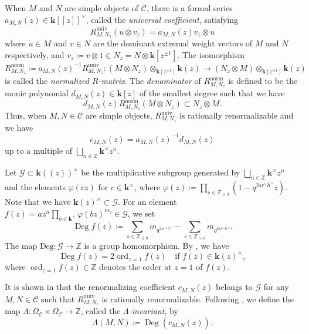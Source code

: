 \documentclass[12pt]{amsart}
\theoremstyle{definition}
\theoremstyle{remark}
\numberwithin{equation}{section}
\begin{document}
When $M$ and $N$ are simple objects of $\mathscr{C}$, there is a formal series $a_{M,N}(z) \in \mathbf{k}[\![z]\!]^\times$, called the {\em universal coefficient}, satisfying
\[ R^{\mathrm{univ}}_{M,N_z}(u\otimes v_z) = a_{M,N}(z) v_z \otimes u\]
where $u \in M$ and $v \in N$ are the dominant extremal weight vectors of $M$ and $N$ respectively, and $v_z \coloneqq v \otimes 1 \in N_z = N \otimes \mathbf{k}[z^{\pm 1}]$. 
The isomorphism
\[ R^{\mathrm{norm}}_{M,N_z} \coloneqq a_{M,N}(z)^{-1} R^{\mathrm{univ}}_{M,N_z} \colon (M \otimes N_z) \otimes_{\mathbf{k}[z^{\pm 1}]} \mathbf{k}(z) \to (N_z \otimes M) \otimes_{\mathbf{k}[z^{\pm 1}]} \mathbf{k}(z)  \]
is called the {\em normalized $R$-matrix}. 
The {\em denominator} of $R^{\mathrm{norm}}_{M,N_z}$ is defined to be the monic polynomial $d_{M,N}(z) \in \mathbf{k}[z]$ of the smallest degree such that we have
\[ d_{M,N}(z) R^{\mathrm{norm}}_{M,N_z} (M \otimes N_z) \subset N_z \otimes M.\]  
Thus, when $M, N\in \mathscr{C}$ are simple objects, $R_{M,N_z}^{\mathrm{univ}}$ is  rationally renormalizable and we have 
\begin{equation} \label{eq:c=ad}
c_{M,N}(z) = a_{M,N}(z)^{-1} d_{M,N}(z)
\end{equation}
up to a multiple of $\bigsqcup_{n \in \mathbb{Z}}\mathbf{k}^\times z^n$.

Let $\mathcal{G} \subset \mathbf{k}(\!(z)\!)^\times$ be the multiplicative subgroup generated by $\bigsqcup_{n \in \mathbb{Z}}\mathbf{k}^\times z^n$ and the elements $\varphi(cz)$ for $c \in \mathbf{k}^\times$, where $\varphi(z) \coloneqq \prod_{s \in \mathbb{Z}_{\ge 0}}(1-q^{2sr^\vee h^\vee}z)$.
Note that we have $\mathbf{k}(z)^\times \subset \mathcal{G}$. 
For an element $f(z) = az^n \prod_{b \in \mathbf{k}^\times}\varphi(bz)^{m_b} \in \mathcal{G}$, we set
\[ \mathop{\mathrm{Deg}} f(z) \coloneqq \sum_{s \in \mathbb{Z}_{\le 0}} m_{q^{2sr^\vee h^\vee}} - \sum_{s \in \mathbb{Z}_{>0}}m_{q^{2sr^\vee h^\vee}}. \]
The map $\mathrm{Deg} \colon \mathcal{G} \to \mathbb{Z}$ is a group homomorphism. 
By \cite[Lemma 3.4(i)]{kkop-2020}, we have
\[ \mathop{\mathrm{Deg}} f(z) = 2 \mathop{\mathrm{ord}}_{z=1} f(z) \quad \text{if $f(z) \in \mathbf{k}(z)^\times$}, \]
where $\mathop{\mathrm{ord}}_{z=1} f(z) \in \mathbb{Z}$ denotes the order at $z=1$ of $f(z)$.

It is shown in \cite[Proposition 3.2]{kkop-2020} that the renormalizing coefficient $c_{M,N}(z)$ belongs to $\mathcal{G}$ for any $M,N \in \mathscr{C}$ such that $R^{\mathrm{univ}}_{M,N_z}$ is rationally renormalizable.  
Following \cite{kkop-2020}, we define the map $\Lambda \colon \Omega_{\mathscr{C}} \times \Omega_{\mathscr{C}} \to \mathbb{Z}$, called the \emph{$\Lambda$-invariant},  by
\[ \Lambda(M,N) \coloneqq \mathop{\mathrm{Deg}}(c_{M,N}(z)). \]
\end{document}
